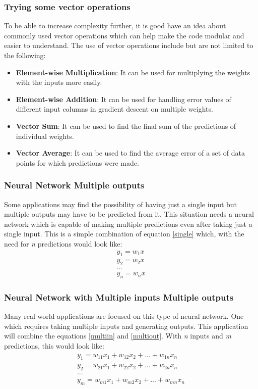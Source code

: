 \documentclass[conference,compsoc]{IEEEtran}
\begin{document}
\subsubsection{Trying some vector operations}
To be able to increase complexity further, it  is good have an idea about commonly used vector operations which can help make the code modular and easier to understand. The use of vector operations include but are not limited to the following:
\begin{itemize}
    \item \textbf{Element-wise Multiplication}: It can be used for multiplying the weights with the inputs more easily.
    \item \textbf{Element-wise Addition}: It can be used for handling error values  of different input columns in gradient descent on multiple weights.
    \item \textbf{Vector Sum}: It can be used to find the final sum of the predictions of individual weights.
    \item \textbf{Vector Average}: It can be used to find the average error of a set of data points for which predictions were made.
\end{itemize}

\subsubsection{Neural Network Multiple outputs}
Some applications may find the possibility of having just a single input but multiple outputs may have to be predicted from it. This situation needs a neural network which is capable of making multiple predictions even after taking just a single input. This is a simple combination of equation \ref{single} which, with the need for \emph{n} predictions would look like:
\begin{gather*}\label{multiout}
    y_1 = w_1x \\
    y_2 = w_2x \\
    ... \\
    y_n = w_nx 
\end{gather*}

\subsubsection{Neural Network with Multiple inputs Multiple outputs}
Many real world applications are focused on this type of neural network. One which requires taking multiple inputs and generating outputs. This application will combine the equations \ref{multiin} and \ref{multiout}. With \emph{n} inputs and \emph{m} predictions, this would look like:
\begin{gather*}\label{multiinout}
    y_1 = w_{11}x_1+w_{12}x_2+...+w_{1n}x_n \\
    y_2 = w_{21}x_1+w_{22}x_2+...+w_{2n}x_n \\
    ... \\
    y_m = w_{m1}x_1+w_{m2}x_2+...+w_{mn}x_n 
\end{gather*}
\end{document}
